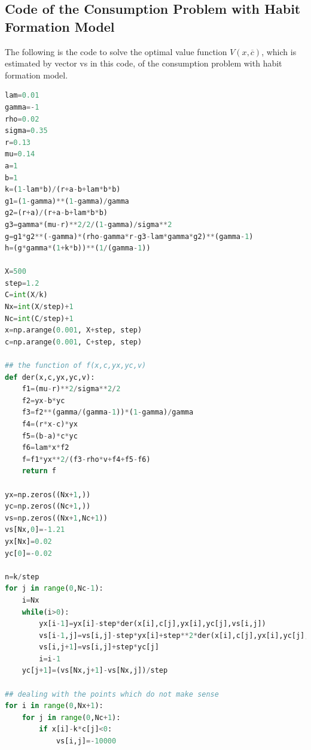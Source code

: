 \documentclass[a4paper]{article}
\theoremstyle{definition}
\numberwithin{equation}{section}
\begin{document}
\subsection{Code of the Consumption Problem with Habit Formation Model}
The following is the code to solve the optimal value function $V(x,\overline c)$, which is estimated by vector vs in this code, of the consumption problem with habit formation model.
\begin{lstlisting}[language=python]
lam=0.01
gamma=-1
rho=0.02
sigma=0.35
r=0.13
mu=0.14
a=1
b=1
k=(1-lam*b)/(r+a-b+lam*b*b)
g1=(1-gamma)**(1-gamma)/gamma
g2=(r+a)/(r+a-b+lam*b*b)
g3=gamma*(mu-r)**2/2/(1-gamma)/sigma**2
g=g1*g2**(-gamma)*(rho-gamma*r-g3-lam*gamma*g2)**(gamma-1)
h=(g*gamma*(1+k*b))**(1/(gamma-1))

X=500
step=1.2
C=int(X/k)
Nx=int(X/step)+1
Nc=int(C/step)+1
x=np.arange(0.001, X+step, step)
c=np.arange(0.001, C+step, step)
       
## the function of f(x,c,yx,yc,v)
def der(x,c,yx,yc,v):
    f1=(mu-r)**2/sigma**2/2
    f2=yx-b*yc
    f3=f2**(gamma/(gamma-1))*(1-gamma)/gamma
    f4=(r*x-c)*yx
    f5=(b-a)*c*yc
    f6=lam*x*f2
    f=f1*yx**2/(f3-rho*v+f4+f5-f6)
    return f

yx=np.zeros((Nx+1,))
yc=np.zeros((Nc+1,))
vs=np.zeros((Nx+1,Nc+1))
vs[Nx,0]=-1.21
yx[Nx]=0.02
yc[0]=-0.02

n=k/step
for j in range(0,Nc-1):
    i=Nx
    while(i>0):
        yx[i-1]=yx[i]-step*der(x[i],c[j],yx[i],yc[j],vs[i,j])
        vs[i-1,j]=vs[i,j]-step*yx[i]+step**2*der(x[i],c[j],yx[i],yc[j],vs[i,j])/2
        vs[i,j+1]=vs[i,j]+step*yc[j]
        i=i-1
    yc[j+1]=(vs[Nx,j+1]-vs[Nx,j])/step

## dealing with the points which do not make sense
for i in range(0,Nx+1):
    for j in range(0,Nc+1):
        if x[i]-k*c[j]<0:
            vs[i,j]=-10000
\end{lstlisting}
\newpage




\newpage
\end{document}
